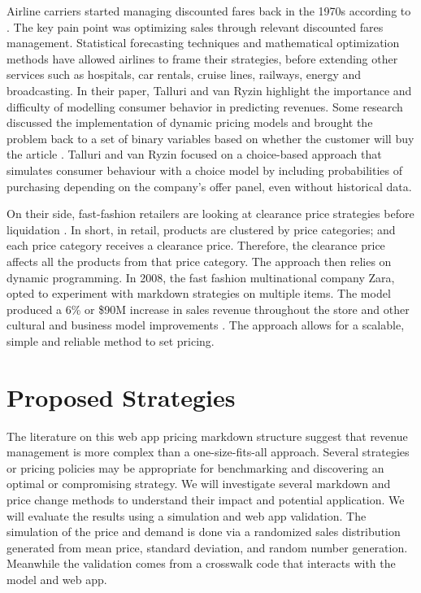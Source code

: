 \documentclass[11pt,a4paper]{article}
\begin{document}
Airline carriers started managing discounted fares back in the 1970s according to \linebreak 
\cite{talluri2004revenue}. 
The key pain point was optimizing sales through relevant discounted fares management. 
Statistical forecasting techniques and mathematical optimization methods have allowed airlines to frame their strategies, before extending other services such as hospitals, car rentals, cruise lines, railways, energy and broadcasting. 
In their paper, Talluri and van Ryzin highlight the importance and difficulty of modelling consumer behavior in predicting revenues. 
Some research discussed the implementation of dynamic pricing models and brought the problem back to a set of binary variables based on whether the customer will buy the article \cite{bitran1998structured,feng2000perishable,gallego1994optimal}. 
Talluri and van Ryzin focused on a choice-based approach that simulates consumer behaviour with a choice model by including probabilities of purchasing depending on the company’s offer panel, even without historical data.

On their side, fast-fashion retailers are looking at clearance price strategies before liquidation \cite{caro2012clearance}. 
In short, in retail, products are clustered by price categories; and each price category receives a clearance price. 
Therefore, the clearance price affects all the products from that price category. 
The approach then relies on dynamic programming. 
In 2008, the fast fashion multinational company Zara, opted to experiment with markdown strategies on multiple items. 
The model produced a 6\% or \$90M increase in sales revenue throughout the store and other cultural and business model improvements \cite{caro2012clearance}. 
The approach allows for a scalable, simple and reliable method to set pricing. 

\section{Proposed Strategies}
The literature on this web app pricing markdown structure suggest that revenue management is more complex than a one-size-fits-all approach. 
Several strategies or pricing policies may be appropriate for benchmarking and discovering an optimal or compromising strategy.
We will investigate several markdown and price change methods to understand their impact and potential application. 
We will evaluate the results using a simulation and web app validation. 
The simulation of the price and demand is done via a randomized sales distribution generated from mean price, standard deviation, and random number generation. 
Meanwhile the validation comes from a crosswalk code that interacts with the model and web app.
\end{document}
